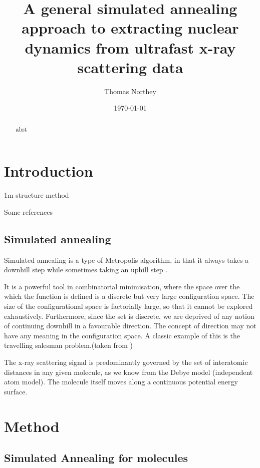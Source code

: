 \documentclass[]{article}
\title{A general simulated annealing approach to extracting nuclear dynamics from ultrafast x-ray scattering data}
\author{Thomas Northey}
\date{\today}
\begin{document}
	
	\maketitle
	
	\begin{abstract}
		abst
	\end{abstract}
	
	\section{Introduction}
	1m structure method \cite{yong2021determination}
	
	Some references \cite{yong2019scattering,yong2021determination,stankus2019ultrafast,wolf2019photochemical,moreno2019ab,northey2014ab,northey2016elastic}
	
	\subsection{Simulated annealing}
	
	Simulated annealing is a type of Metropolis algorithm, in that it always takes a downhill step while sometimes taking an uphill step \cite{press2007numerical}.
	
	It is a powerful tool in combinatorial minimisation, where the space over the which the function is defined is a discrete but very large configuration space. The size of the configurational space is factorially large, so that it cannot be explored exhaustively. Furthermore, since the set is discrete, we are deprived of any notion of continuing downhill in a favourable direction. The concept of direction may not have any meaning in the configuration space. A classic example of this is the travelling salesman problem.(taken from \cite{press2007numerical})
	
	
	The x-ray scattering signal is predominantly governed by the set of interatomic distances in any given molecule, as we know from the Debye model (independent atom model). The molecule itself moves along a continuous potential energy surface.
	
	
	\section{Method}
	
	\subsection{Simulated Annealing for molecules}
	
\end{document}
